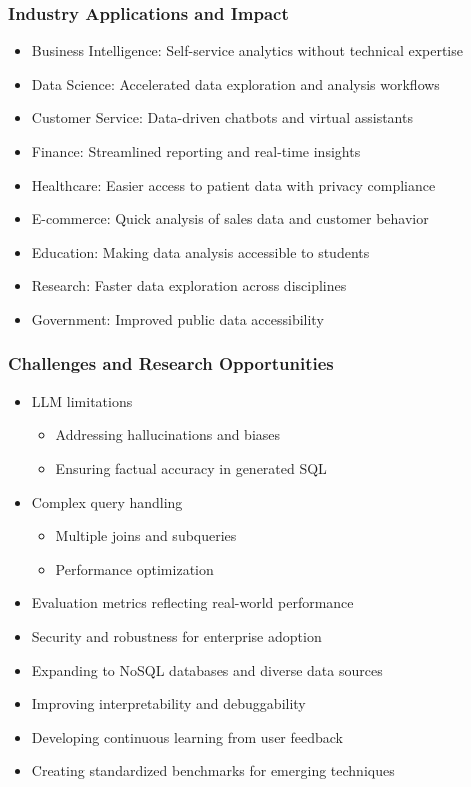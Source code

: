 \begin{frame}\frametitle{Industry Applications and Impact}
      \begin{itemize}
        \item Business Intelligence: Self-service analytics without technical expertise
        \item Data Science: Accelerated data exploration and analysis workflows
        \item Customer Service: Data-driven chatbots and virtual assistants
        \item Finance: Streamlined reporting and real-time insights
        \item Healthcare: Easier access to patient data with privacy compliance
        \item E-commerce: Quick analysis of sales data and customer behavior
        \item Education: Making data analysis accessible to students
        \item Research: Faster data exploration across disciplines
        \item Government: Improved public data accessibility
      \end{itemize}
\end{frame}

\begin{frame}\frametitle{Challenges and Research Opportunities}
      \begin{itemize}
        \item LLM limitations
          \begin{itemize}
            \item Addressing hallucinations and biases
            \item Ensuring factual accuracy in generated SQL
          \end{itemize}
        \item Complex query handling
          \begin{itemize}
            \item Multiple joins and subqueries
            \item Performance optimization
          \end{itemize}
        \item Evaluation metrics reflecting real-world performance
        \item Security and robustness for enterprise adoption
        \item Expanding to NoSQL databases and diverse data sources
        \item Improving interpretability and debuggability
        \item Developing continuous learning from user feedback
        \item Creating standardized benchmarks for emerging techniques
      \end{itemize}
\end{frame}